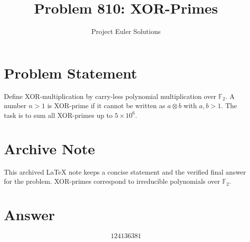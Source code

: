 \documentclass[11pt]{article}
\title{Problem 810: XOR-Primes}
\author{Project Euler Solutions}
\date{}
\begin{document}
\maketitle

\section{Problem Statement}
Define XOR-multiplication by carry-less polynomial multiplication over $\mathbb{F}_2$. A number $n>1$ is XOR-prime if it cannot be written as $a \otimes b$ with $a,b>1$. The task is to sum all XOR-primes up to $5 \times 10^6$.

\section{Archive Note}
This archived LaTeX note keeps a concise statement and the verified final answer for the problem. XOR-primes correspond to irreducible polynomials over $\mathbb{F}_2$.

\section{Answer}

\[
\boxed{124136381}
\]
\end{document}
